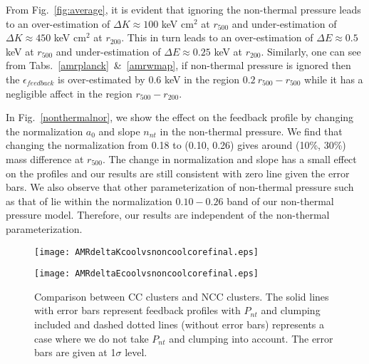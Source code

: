 \documentclass[a4paper,fleqn,usenatbib]{mnras}
\begin{document}
From Fig.~\ref{fig:average}, it is evident that ignoring the non-thermal pressure leads to an over-estimation of $\Delta K\approx 100$ keV cm$^2$ at $r_{500}$ and under-estimation of $\Delta K\approx 450$ keV cm$^2$ at $r_{200}$. This in turn leads to an  over-estimation of  $\Delta E \approx 0.5$ keV at $r_{500}$ and under-estimation of $\Delta E\approx 0.25$ keV  at $r_{200}$. Similarly, one can see from Tabs.~\ref{amrplanck}~\&~\ref{amrwmap},  if non-thermal pressure is ignored then the  $\epsilon_{feedback}$ is over-estimated by $0.6$ keV in the region $0.2~r_{500}-r_{500}$ while it has a negligible affect in the region $r_{500}-r_{200}$.

In Fig.~\ref{nonthermalnor}, we show the effect on the feedback profile by changing the normalization $a_0$ and slope $n_{nt}$ in the non-thermal pressure. We find that changing the normalization from 0.18 to (0.10, 0.26) gives around (10\%, 30\%) mass difference at $r_{500}$. The change in normalization and slope has a small effect on the profiles and our results are still consistent with zero line given the error bars. We also observe that other parameterization of non-thermal pressure such as that of \cite{Shi2015,Rasia2004}  lie  within the normalization $0.10-0.26$ band of our non-thermal pressure model. Therefore, our results are independent of the non-thermal parameterization.
\begin{figure*}
\begin{minipage}{8.5cm}
 \texttt{[image: AMRdeltaKcoolvsnoncoolcorefinal.eps]}
\end{minipage}
\begin{minipage}{8.5cm}
 \texttt{[image: AMRdeltaEcoolvsnoncoolcorefinal.eps]}
\end{minipage}   
\caption{Comparison between CC clusters and NCC clusters. The solid lines with error bars represent feedback profiles with  $P_{nt}$ and clumping included and dashed dotted lines (without error bars) represents a case where we do not take  $P_{nt}$ and clumping into account. The error bars are given at 1$\sigma$ level.
}
\label{fig:CCandNCC}
\end{figure*}
\end{document}
